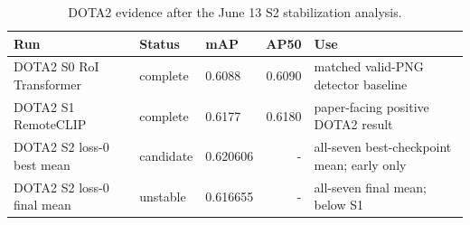 \begin{table}[t]
\centering
\small
\caption{DOTA2 evidence after the June 13 S2 stabilization analysis.}
\label{tab:dota2_current}
\begin{tabular}{lllrl}
\toprule
Run & Status & mAP & AP50 & Use \\
\midrule
DOTA2 S0 RoI Transformer & complete & 0.6088 & 0.6090 & matched valid-PNG detector baseline \\
DOTA2 S1 RemoteCLIP & complete & 0.6177 & 0.6180 & paper-facing positive DOTA2 result \\
DOTA2 S2 loss-0 best mean & candidate & 0.620606 & - & all-seven best-checkpoint mean; early only \\
DOTA2 S2 loss-0 final mean & unstable & 0.616655 & - & all-seven final mean; below S1 \\
\bottomrule
\end{tabular}
\end{table}
